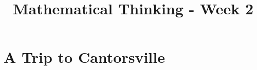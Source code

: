 \documentclass[12pt]{exam}
\title{Mathematical Thinking - Week 2}
\begin{document}
\maketitle
\tableofcontents
\section{A Trip to Cantorsville}
\begin{questions}
\question 
\end{questions}
\end{document}

